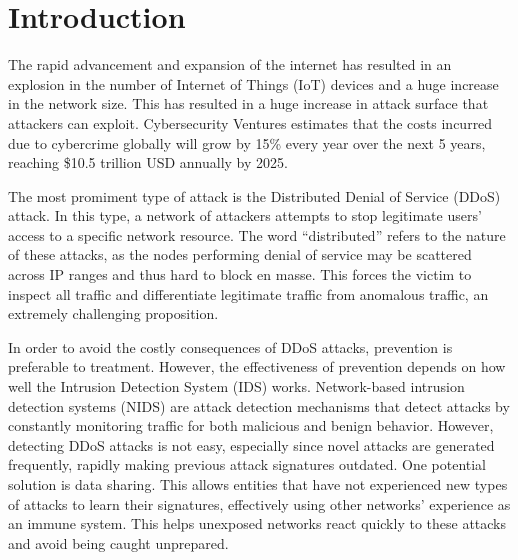 \section{Introduction}
\label{sec:intro}
\begin{intro}

The rapid advancement and expansion of the internet has resulted in 
an explosion in the number of Internet of Things (IoT) devices and a huge increase in the network size. This has resulted in a huge increase in attack surface that attackers can exploit. Cybersecurity Ventures estimates that the costs incurred due to cybercrime globally will grow by 15\% every year over the next 5 years, reaching \$10.5 trillion USD annually by 2025. 

The most promiment type of attack is the Distributed Denial of Service (DDoS) attack. In this type, a network of attackers attempts to stop legitimate users' access to a specific network resource. The word ``distributed'' refers to the nature of these attacks, as the nodes performing denial of service may be scattered across IP ranges and thus hard to block en masse. This forces the victim to inspect all traffic and differentiate legitimate traffic from anomalous traffic, an extremely challenging proposition.

In order to avoid the costly consequences of DDoS attacks, prevention is preferable to treatment. However, the effectiveness of prevention depends on how well the Intrusion Detection System (IDS) works. Network-based intrusion detection systems (NIDS) are attack detection mechanisms that detect attacks by constantly monitoring traffic for both malicious and benign behavior. However, detecting DDoS attacks is not easy, especially since novel attacks are generated frequently, rapidly making previous attack signatures outdated. One potential solution is data sharing. This allows entities that have not experienced new types of attacks to learn their signatures, effectively using other networks' experience as an immune system. This helps unexposed networks react quickly to these attacks and avoid being caught unprepared.


\end{intro}
